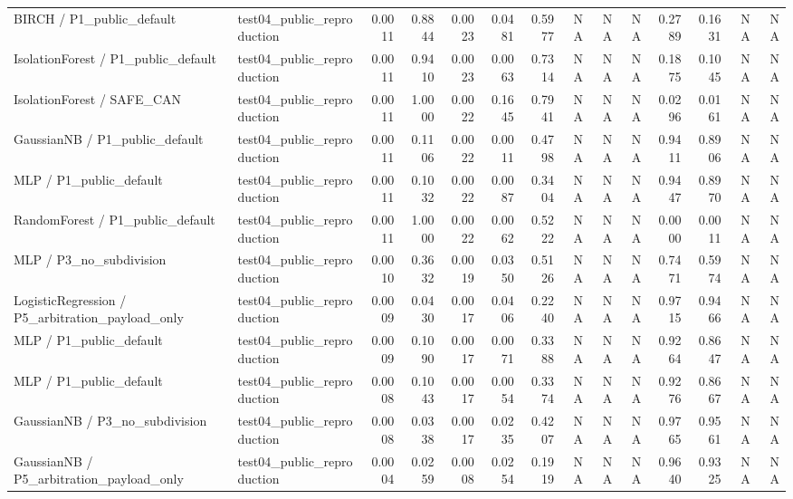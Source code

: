 \begin{tabular}{llrrrrrrrrrrrr}
BIRCH / P1\_public\_default & test04\_public\_reproduction & 0.0011 & 0.8844 & 0.0023 & 0.0481 & 0.5977 & NA & NA & NA & 0.2789 & 0.1631 & NA & NA \\
IsolationForest / P1\_public\_default & test04\_public\_reproduction & 0.0011 & 0.9410 & 0.0023 & 0.0063 & 0.7314 & NA & NA & NA & 0.1875 & 0.1045 & NA & NA \\
IsolationForest / SAFE\_CAN & test04\_public\_reproduction & 0.0011 & 1.0000 & 0.0022 & 0.1645 & 0.7941 & NA & NA & NA & 0.0296 & 0.0161 & NA & NA \\
GaussianNB / P1\_public\_default & test04\_public\_reproduction & 0.0011 & 0.1106 & 0.0022 & 0.0011 & 0.4798 & NA & NA & NA & 0.9411 & 0.8906 & NA & NA \\
MLP / P1\_public\_default & test04\_public\_reproduction & 0.0011 & 0.1032 & 0.0022 & 0.0087 & 0.3404 & NA & NA & NA & 0.9447 & 0.8970 & NA & NA \\
RandomForest / P1\_public\_default & test04\_public\_reproduction & 0.0011 & 1.0000 & 0.0022 & 0.0062 & 0.5222 & NA & NA & NA & 0.0000 & 0.0011 & NA & NA \\
MLP / P3\_no\_subdivision & test04\_public\_reproduction & 0.0010 & 0.3632 & 0.0019 & 0.0350 & 0.5126 & NA & NA & NA & 0.7471 & 0.5974 & NA & NA \\
LogisticRegression / P5\_arbitration\_payload\_only & test04\_public\_reproduction & 0.0009 & 0.0430 & 0.0017 & 0.0406 & 0.2240 & NA & NA & NA & 0.9715 & 0.9466 & NA & NA \\
MLP / P1\_public\_default & test04\_public\_reproduction & 0.0009 & 0.1090 & 0.0017 & 0.0071 & 0.3388 & NA & NA & NA & 0.9264 & 0.8647 & NA & NA \\
MLP / P1\_public\_default & test04\_public\_reproduction & 0.0008 & 0.1043 & 0.0017 & 0.0054 & 0.3374 & NA & NA & NA & 0.9276 & 0.8667 & NA & NA \\
GaussianNB / P3\_no\_subdivision & test04\_public\_reproduction & 0.0008 & 0.0338 & 0.0017 & 0.0235 & 0.4207 & NA & NA & NA & 0.9765 & 0.9561 & NA & NA \\
GaussianNB / P5\_arbitration\_payload\_only & test04\_public\_reproduction & 0.0004 & 0.0259 & 0.0008 & 0.0254 & 0.1919 & NA & NA & NA & 0.9640 & 0.9325 & NA & NA \\
\bottomrule
\end{tabular}
